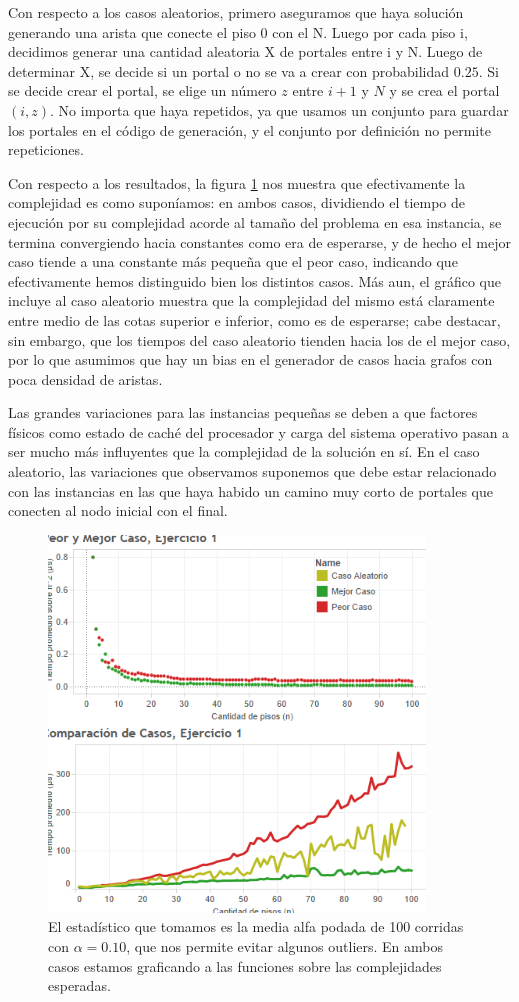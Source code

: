 \documentclass{article}
\theoremstyle{definition}
\theoremstyle{remark}
\begin{document}
Con respecto a los casos aleatorios, primero aseguramos que haya solución generando una arista que conecte el piso 0 con el N. Luego por cada piso i, decidimos generar una cantidad aleatoria X de portales entre i y N. Luego de determinar X, se decide si un portal o no se va a crear con probabilidad $0.25$. Si se decide crear el portal, se elige un número $z$ entre $i+1$ y $N$ y se crea el portal $(i, z)$. No importa que haya repetidos, ya que usamos un conjunto para guardar los portales en el código de generación, y el conjunto por definición no permite repeticiones.

Con respecto a los resultados, la figura \ref{grf:ex1} nos muestra que efectivamente la complejidad es como suponíamos: en ambos casos, dividiendo el tiempo de ejecución por su complejidad acorde al tamaño del problema en esa instancia, se termina convergiendo hacia constantes como era de esperarse, y de hecho el mejor caso tiende a una constante más pequeña que el peor caso, indicando que efectivamente hemos distinguido bien los distintos casos. Más aun, el gráfico que incluye al caso aleatorio muestra que la complejidad del mismo está claramente entre medio de las cotas superior e inferior, como es de esperarse; cabe destacar, sin embargo, que los tiempos del caso aleatorio tienden hacia los de el mejor caso, por lo que asumimos que hay un bias en el generador de casos hacia grafos con poca densidad de aristas.

Las grandes variaciones para las instancias pequeñas se deben a que factores físicos como estado de caché del procesador y carga del sistema operativo pasan a ser mucho más influyentes que la complejidad de la solución en sí. En el caso aleatorio, las variaciones que observamos suponemos que debe estar relacionado con las instancias en las que haya habido un camino muy corto de portales que conecten al nodo inicial con el final.

\begin{figure}
\centering
\includegraphics[width=10cm]{ex1}
\caption{El estadístico que tomamos es la media alfa podada de 100 corridas con $\alpha = 0.10$, que nos permite evitar algunos outliers. En ambos casos estamos graficando a las funciones sobre las complejidades esperadas. \label{grf:ex1}}
\end{figure}
\end{document}
